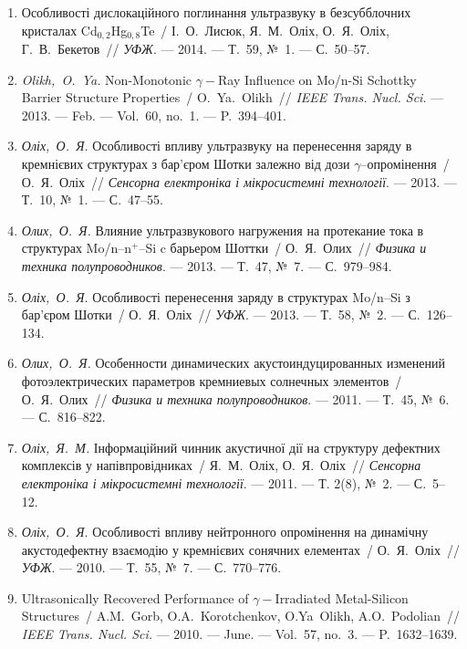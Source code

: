 \begin{enumerate}[label=\arabic*.,leftmargin=1cm,itemindent=0cm]
\item
Особливості дислокаційного поглинання
  ультразвуку в безсубблочних кристалах
  {C}d$_{0,2}${H}g$_{0,8}${T}e~/ І.~О.~Лисюк, Я.~М.~Оліх,
  О.~Я.~Оліх, Г.~В.~Бекетов~// \emph{УФЖ}. ---
  2014. ---
  Т.~59, {№}~1. ---
  {С.}~50--57.

\item
\emph{Olikh,~O.~Ya.} Non-Monotonic $\gamma-$Ray Influence on {M}o/n-{S}i
  {S}chottky Barrier Structure Properties~/ O.~Ya.~Olikh~// \emph{IEEE
  Trans. Nucl. Sci.} ---
  2013. --- Feb. ---
  Vol.~60, no.~1. ---
  P.~394--401.

\item
\emph{Оліх,~О.~Я.} Особливості впливу
  ультразвуку на перенесення заряду в
  кремнієвих структурах з бар’єром {Ш}отки
  залежно від дози $\gamma$--опромінення~/
  О.~Я.~Оліх~// \emph{Сенсорна електроніка і
  мікросистемні технології}. ---
  2013. ---
  Т.~10, {№}~1. ---
  {С.}~47--55.

\item
\emph{Олих,~О.~Я.} Влияние ультразвукового
  нагружения на протекание тока в
  структурах {M}o/n--n$^+$--{S}i c барьером {Ш}оттки~/
  О.~Я.~Олих~// \emph{Физика и техника
  полупроводников}. ---
  2013. ---
  Т.~47, {№}~7. ---
  {С.}~979--984.

\item
\emph{Оліх,~О.~Я.} Особливості перенесення
  заряду в структурах {M}o/n--{S}i з бар’єром
  {Ш}отки~/ О.~Я.~Оліх~// \emph{УФЖ}. ---
  2013. ---
  Т.~58, {№}~2. ---
  {С.}~126--134.

\item
\emph{Олих,~О.~Я.} Особенности динамических
  акустоиндуцированных изменений
  фотоэлектрических параметров кремниевых
  солнечных элементов~/ О.~Я.~Олих~//
  \emph{Физика и техника полупроводников}. ---
  2011. ---
  Т.~45, {№}~6. ---
  {С.}~816--822.

\item
\emph{Оліх,~Я.~М.} Інформаційний чинник
  акустичної дії на структуру дефектних
  комплексів у напівпровідниках~/ Я.~М.~Оліх,
  О.~Я.~Оліх~// \emph{Сенсорна електроніка і
  мікросистемні технології}. ---
  2011. ---
  Т. 2(8), {№}~2. ---
  {С.}~5--12.

\item
\emph{Оліх,~О.~Я.} Особливості впливу
  нейтронного опромінення на динамічну
  акустодефектну взаємодію у кремнієвих
  сонячних елементах~/ О.~Я.~Оліх~// \emph{УФЖ}.
  ---
  2010. ---
  Т.~55, {№}~7. ---
  {С.}~770--776.


\item
Ultrasonically Recovered Performance of $\gamma-$Irradiated Metal-Silicon
  Structures~/ A.M.~Gorb, O.A.~Korotchenkov, O.Ya~Olikh, A.O.~Podolian~//
  \emph{IEEE Trans. Nucl. Sci.} ---
  2010. --- June. ---
  Vol.~57, no.~3. ---
  P.~1632--1639.


\end{enumerate}
